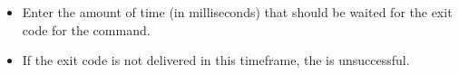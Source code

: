 
\begin{itemize}
\item Enter the amount of time (in milliseconds) that should be waited for the exit code for the command. 
\item If the exit code is not delivered in this timeframe, the \gdstep{} is unsuccessful. 
\end{itemize}
